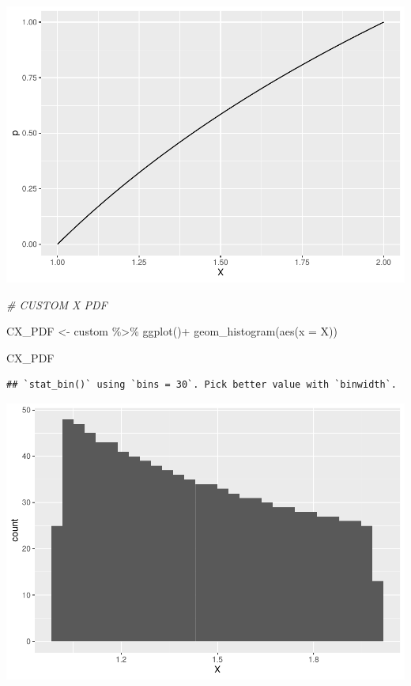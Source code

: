 \documentclass[
]{article}
\newenvironment{Shaded}{\begin{snugshade}}{\end{snugshade}}
\newcommand{\AttributeTok}[1]{\textcolor[rgb]{0.77,0.63,0.00}{#1}}
\newcommand{\CommentTok}[1]{\textcolor[rgb]{0.56,0.35,0.01}{\textit{#1}}}
\newcommand{\FunctionTok}[1]{\textcolor[rgb]{0.00,0.00,0.00}{#1}}
\newcommand{\NormalTok}[1]{#1}
\newcommand{\OtherTok}[1]{\textcolor[rgb]{0.56,0.35,0.01}{#1}}
\newcommand{\SpecialCharTok}[1]{\textcolor[rgb]{0.00,0.00,0.00}{#1}}
\begin{document}
\includegraphics{HW-3_files/figure-latex/unnamed-chunk-2-1.pdf}

\begin{Shaded}
\begin{Highlighting}[]
\CommentTok{\# CUSTOM X PDF}

\NormalTok{CX\_PDF }\OtherTok{\textless{}{-}}\NormalTok{ custom }\SpecialCharTok{\%\textgreater{}\%} 
  \FunctionTok{ggplot}\NormalTok{()}\SpecialCharTok{+}
  \FunctionTok{geom\_histogram}\NormalTok{(}\FunctionTok{aes}\NormalTok{(}\AttributeTok{x =}\NormalTok{ X))}

\NormalTok{CX\_PDF}
\end{Highlighting}
\end{Shaded}

\begin{verbatim}
## `stat_bin()` using `bins = 30`. Pick better value with `binwidth`.
\end{verbatim}

\includegraphics{HW-3_files/figure-latex/unnamed-chunk-2-2.pdf}
\end{document}
